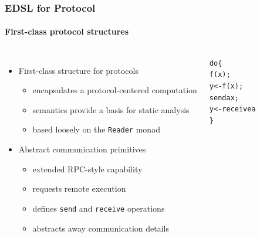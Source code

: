 \documentclass{beamer}
\begin{document}
\begin{frame}[fragile]
  \frametitle{EDSL for Protocol}
  \framesubtitle{First-class protocol structures}

  \begin{columns}[c]
    \begin{itemize}
    \item First-class structure for protocols
      \begin{itemize}
      \item encapsulates a protocol-centered computation
      \item semantics provide a basis for static analysis
      \item based loosely on the \verb+Reader+ monad
      \end{itemize}
    \item Abstract communication primitives
      \begin{itemize}
      \item extended RPC-style capability
      \item requests remote execution
      \item defines \verb+send+ and \verb+receive+ operations
      \item abstracts away communication details
      \end{itemize}
    \end{itemize}
  \begin{alltt}
  do \{
       f(x);
       y <- f(x);
       send a x;
       y <- receive a
  \}
  \end{alltt}
  \end{columns}
\end{frame}
\end{document}
